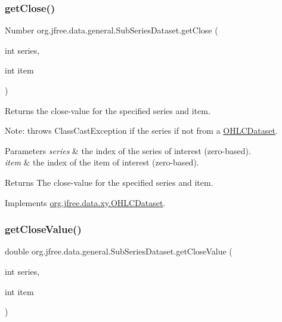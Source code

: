 \subsubsection{\texorpdfstring{get\+Close()}{getClose()}}
{\footnotesize\ttfamily Number org.\+jfree.\+data.\+general.\+Sub\+Series\+Dataset.\+get\+Close (\begin{DoxyParamCaption}\item[{int}]{series,  }\item[{int}]{item }\end{DoxyParamCaption})}

Returns the close-\/value for the specified series and item. 

Note\+: throws {\ttfamily Class\+Cast\+Exception} if the series if not from a \mbox{\hyperlink{}{O\+H\+L\+C\+Dataset}}.


\begin{DoxyParams}{Parameters}
{\em series} & the index of the series of interest (zero-\/based). \\
\hline
{\em item} & the index of the item of interest (zero-\/based).\\
\hline
\end{DoxyParams}
\begin{DoxyReturn}{Returns}
The close-\/value for the specified series and item. 
\end{DoxyReturn}


Implements \mbox{\hyperlink{interfaceorg_1_1jfree_1_1data_1_1xy_1_1_o_h_l_c_dataset_a7c84699d1c3f6d5b4d1378d7b23d49ac}{org.\+jfree.\+data.\+xy.\+O\+H\+L\+C\+Dataset}}.

\mbox{\label{classorg_1_1jfree_1_1data_1_1general_1_1_sub_series_dataset_abadc41ef36d20718c10f784dd786a5b1}} 
\subsubsection{\texorpdfstring{get\+Close\+Value()}{getCloseValue()}}
{\footnotesize\ttfamily double org.\+jfree.\+data.\+general.\+Sub\+Series\+Dataset.\+get\+Close\+Value (\begin{DoxyParamCaption}\item[{int}]{series,  }\item[{int}]{item }\end{DoxyParamCaption})}

